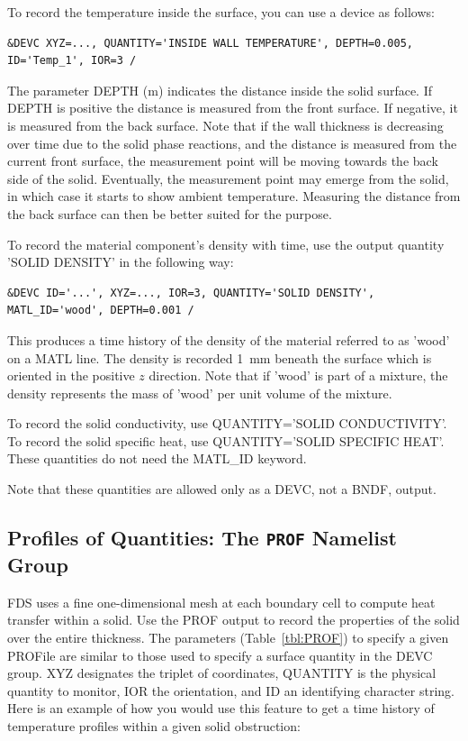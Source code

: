 \documentclass[11pt]{book}
\begin{document}
To record the temperature inside the surface, you can use a device as follows:

\begin{lstlisting}
&DEVC XYZ=..., QUANTITY='INSIDE WALL TEMPERATURE', DEPTH=0.005, ID='Temp_1', IOR=3 /
\end{lstlisting}

\noindent
The parameter {\ct DEPTH} (m) indicates the distance inside the solid surface. If {\ct DEPTH} is positive the distance is measured from the front surface. If negative, it is measured from the back surface. Note that if the wall thickness is decreasing over time due to the solid phase reactions, and the distance is measured from the current front surface, the measurement point will be moving towards the back side of the solid. Eventually, the measurement point may emerge from the solid, in which case it starts to show ambient temperature. Measuring the distance from the back surface can then be better suited for the purpose.

To record the material component's density with time, use the output quantity {\ct 'SOLID DENSITY'} in the following way:

\begin{lstlisting}
&DEVC ID='...', XYZ=..., IOR=3, QUANTITY='SOLID DENSITY', MATL_ID='wood', DEPTH=0.001 /
\end{lstlisting}

\noindent
This produces a time history of the density of the material referred to as {\ct 'wood'} on a {\ct MATL} line. The density is recorded 1~mm beneath
the surface which is oriented in the positive $z$ direction. Note that if {\ct 'wood'} is part of a mixture, the
density represents the mass of {\ct 'wood'} per unit volume of the mixture.

To record the solid conductivity, use {\ct QUANTITY='SOLID CONDUCTIVITY'}. To record the solid specific heat, use {\ct QUANTITY='SOLID SPECIFIC HEAT'}. These quantities do not need the {\ct MATL\_ID} keyword.

Note that these quantities are allowed only as a {\ct DEVC}, not a {\ct BNDF}, output.


\subsection{Profiles of Quantities: The \texorpdfstring{{\tt PROF}}{PROF} Namelist Group}
\label{info:PROF}

FDS uses a fine one-dimensional mesh at each boundary cell to compute heat transfer within a solid. Use the {\ct PROF} output to record the properties of the solid over the entire thickness. The parameters (Table~\ref{tbl:PROF}) to specify a given {\ct PROF}ile are similar to those used to specify a surface quantity in the {\ct DEVC} group. {\ct XYZ} designates the triplet of coordinates, {\ct QUANTITY} is the physical quantity to monitor, {\ct IOR} the orientation, and {\ct ID} an identifying character string. Here is an example of how you would use this feature to get a time history of temperature profiles within a given solid obstruction:
\end{document}
